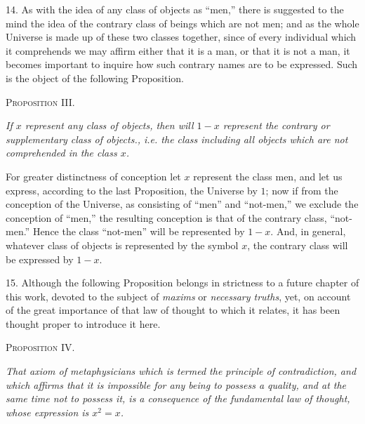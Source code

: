 \documentclass[oneside]{book}
\begin{document}
14. As with the idea of any class of objects as ``men,'' there
is suggested to the mind the idea of the contrary class of beings
which are not men; and as the whole Universe is made up of
these two classes together, since of every individual which it
comprehends we may affirm either that it is a man, or that it is
not a man, it becomes important to inquire how such contrary
names are to be expressed. Such is the object of the following
Proposition.

\begin{center}
\textsc{Proposition III.}
\end{center}

\textit{If $x$ represent any class of objects, then will $1 - x$ represent the
contrary or supplementary class of objects., i.e. the class including
all objects which are not comprehended in the class $x$.}

For greater distinctness of conception let $x$ represent the class
men, and let us express, according to the last Proposition, the
Universe by $1$; now if from the conception of the Universe, as
consisting of ``men'' and ``not-men,'' we exclude the conception
of ``men,'' the resulting conception is that of the contrary class,
``not-men.'' Hence the class ``not-men'' will be represented by
$1 - x$. And, in general, whatever class of objects is represented
by the symbol $x$, the contrary class will be expressed by $1 - x$.

15. Although the following Proposition belongs in strictness
to a future chapter of this work, devoted to the subject of
\textit{maxims} or \textit{necessary truths}, yet, on account of the great importance
of that law of thought to which it relates, it has been
thought proper to introduce it here.

\begin{center}
\textsc{Proposition IV.}
\end{center}

\textit{That axiom of metaphysicians which is termed the principle of
contradiction, and which affirms that it is impossible for any being to
possess a quality, and at the same time not to possess it, is a consequence
of the fundamental law of thought, whose expression is $x^2 = x$.}
\end{document}
